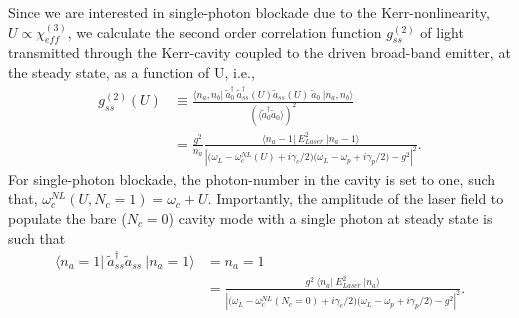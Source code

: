 \documentclass[12pt]{article}
\begin{document}
Since we are interested in single-photon blockade due to the Kerr-nonlinearity, 
$U \propto \chi_{eff}^{(3)}$, we calculate the second order
correlation function $g^{(2)}_{ss}$ of light transmitted through the Kerr-cavity
coupled to the driven broad-band emitter, at the steady state, as a function
of U, i.e.,
\begin{equation}
\begin{split}
g^{(2)}_{ss}(U) &\equiv 
    \frac{ \langle n_a, n_b \vert \:
    \tilde{a}^{\dagger}_0 \: \tilde{a}^{\dagger}_{ss}(U)
    \tilde{a}_{ss}(U) \: \tilde{a}_0 \:
    \vert n_a, n_b \rangle }
    {(\langle \tilde{a}^{\dagger}_0\tilde{a}_0 \rangle)^2}
\\
&= \frac{g^2}{n_a}
    \frac{\langle n_a-1 \vert \: E_{Laser}^2 \: \vert n_a-1 \rangle}
    {\left\vert \big( \omega_L - \omega_c^{NL}(U) + i\gamma_c/2 \big)
    \big( \omega_L - \omega_p + i\gamma_p/2 \big)
    -g^2 \right\vert^2}.
\end{split}
\end{equation}
For single-photon blockade, the photon-number in the cavity is set to one,
such that, $\omega_c^{NL}( U, N_c = 1 )  = \omega_c + U$. Importantly, the
amplitude of the laser field to populate the bare ($N_c=0$) cavity mode 
with a single photon at steady state is such that
\begin{equation}
\begin{split}
\langle n_a=1 \vert \:
    \tilde{a}^{\dagger}_{ss} \tilde{a}_{ss} \:
    \vert n_a=1 \rangle 
    &= n_a = 1
\\
&= \frac{ g^2 \: 
    \langle n_a \vert \: E_{Laser}^2 \: \vert n_a \rangle}
    {\left\vert \big( \omega_L - \omega_c^{NL}(N_c=0) + i\gamma_c/2 \big)
    \big( \omega_L - \omega_p + i\gamma_p/2 \big)
    -g^2 \right\vert^2}.
\end{split}
\end{equation}
\end{document}
